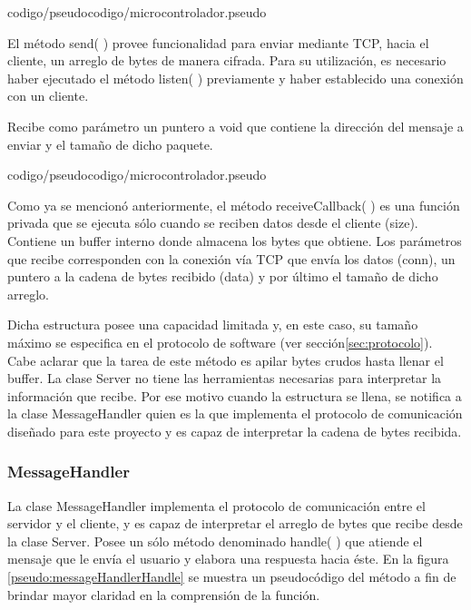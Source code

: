 
{codigo/pseudocodigo/microcontrolador.pseudo}

El método send( ) provee funcionalidad para enviar mediante TCP, hacia el cliente, un arreglo de bytes de manera cifrada.
Para su utilización, es necesario haber ejecutado el método listen( ) previamente y haber establecido una conexión con un cliente.

Recibe como parámetro un puntero a void que contiene la dirección del mensaje a enviar y el tamaño de dicho paquete.


{codigo/pseudocodigo/microcontrolador.pseudo}

Como ya se mencionó anteriormente, el método receiveCallback( ) es una función privada que se ejecuta sólo cuando se reciben datos desde el cliente (size).
Contiene un buffer interno donde almacena los bytes que obtiene.
Los parámetros que recibe corresponden con la conexión vía TCP que envía los datos (conn), un puntero a la cadena de bytes recibido (data) y por último el tamaño de dicho arreglo.

Dicha estructura posee una capacidad limitada y, en este caso, su tamaño máximo se especifica en el protocolo de software (ver sección\ref{sec:protocolo}).
Cabe aclarar que la tarea de este método es apilar bytes crudos hasta llenar el buffer. La clase Server no tiene las herramientas necesarias para interpretar la información que recibe.
Por ese motivo cuando la estructura se llena, se notifica a la clase MessageHandler quien es la que implementa el protocolo de comunicación diseñado para este proyecto y es capaz de interpretar la cadena de bytes recibida.



\subsubsection{MessageHandler}

La clase MessageHandler implementa el protocolo de comunicación entre el servidor y el cliente, y es capaz de interpretar el arreglo de bytes que recibe desde la clase Server.
Posee un sólo método denominado handle( ) que atiende el mensaje que le envía el usuario y elabora una respuesta hacia éste.
En la figura \ref{pseudo:messageHandlerHandle} se muestra un pseudocódigo del método a fin de brindar mayor claridad en la comprensión de la función.

